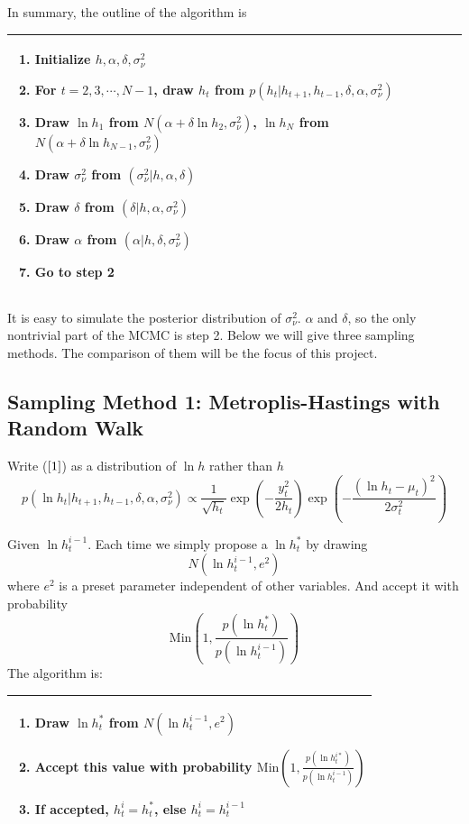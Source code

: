 \documentclass{article}
\begin{document}
In summary, the outline of the algorithm is

\begin{tabular}{|p{11cm}|}
\hline
\begin{enumerate}
\item
Initialize $h, \alpha,\delta,\sigma_\nu^2$
\item
For $t=2,3,\cdots,N-1$, draw $h_t$ from  $p(h_t|h_{t+1},h_{t-1},\delta,\alpha,\sigma_\nu^2)$
\item
Draw $\ln h_1$ from $N(\alpha+\delta\ln h_2, \sigma_\nu^2)$, $\ln h_N$ from $N(\alpha+\delta\ln h_{N-1}, \sigma_\nu^2)$
\item
Draw $\sigma_\nu^2$ from $(\sigma_\nu^2|h,\alpha,\delta)$
\item
Draw $\delta$ from $(\delta|h,\alpha,\sigma_\nu^2)$
\item
Draw $\alpha$ from $(\alpha|h,\delta,\sigma_\nu^2)$
\item
Go to step 2
\end{enumerate}\\
\hline
\end{tabular}

It is easy to simulate the posterior distribution of $\sigma_\nu^2$. $\alpha$ and $\delta$, so the only nontrivial part of the MCMC is step 2. Below we will give three sampling methods. The comparison of them will be the focus of this project.

\subsection{Sampling Method 1: Metroplis-Hastings with Random Walk}
Write ($\ref{1}$) as a distribution of $\ln h$ rather than $h$
\[
p(\ln h_t|h_{t+1},h_{t-1},\delta,\alpha,\sigma_\nu^2)\propto\frac{1}{\sqrt{h_t}}\exp\left(-\frac{y_t^2}{2h_t}\right)\exp\left(-\frac{(\ln h_t-\mu_t)^2}{2\sigma_t^2}\right)
\]

Given $\ln h^{i-1}_t$. Each time we simply propose a $\ln h^*_t$ by drawing
\[
N(\ln h^{i-1}_t,e^2)
\]
where $e^2$ is a preset parameter independent of other variables. And accept it with probability
\[
\textrm{Min}(1,\frac{p(\ln h^*_t)}{p(\ln h^{i-1}_t)})
\]
The algorithm is:

\begin{tabular}{|p{11cm}|}
\hline
\begin{enumerate}
\item
Draw $\ln h^*_t$ from $N(\ln h^{i-1}_t,e^2)$
\item
Accept this value with probability $\textrm{Min}(1,\frac{p(\ln h^{i*}_t)}{p(\ln h^{i-1}_t)})$
\item
If accepted, $h^i_t=h^*_t$, else $h^i_t=h^{i-1}_t$
\end{enumerate}\\
\hline
\end{tabular}
\end{document}
